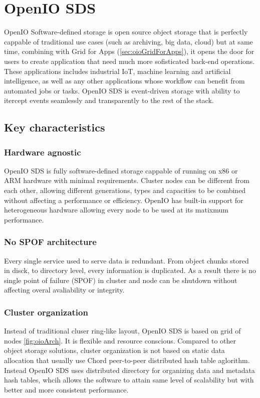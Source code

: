 \chapter{OpenIO SDS}
    OpenIO Software-defined storage is open source object storage that is perfectly cappable of traditional use cases (such as archiving, big data, cloud) but at same time, combining with Grid for Apps (\ref{sec:oioGridForApps}), it opens the door for users to create application that need much more sofisticated back-end operations. These applications includes industrial IoT, machine learning and artificial intelligence, as well as any other applications whose workflow can benefit from automated jobs or tasks\cite{oioNextGen}. OpenIO SDS is event-driven storage with ability to itercept events seamlessly and transparently to the rest of the stack.

    \section{Key characteristics}
    \subsection*{Hardware agnostic}
    OpenIO SDS is fully software-defined storage cappable of running on x86 or ARM hardware with minimal requirements. Cluster nodes can be different from each other, allowing different generations, types and capacities to be combined without affecting a performance or efficiency\cite{oioKeyChars}.
    OpenIO has built-in support for heterogeneous hardware allowing every node to be used at its matixmum performance.
    \subsection*{No SPOF architecture}
    Every single service used to serve data is redundant. From object chunks stored in disck, to directory level, every information is duplicated. As a result there is no single point of failure (SPOF) in cluster and node can be shutdown without affecting overal avaliability or integrity\cite{oioCoreSolution}.
    \subsection*{Cluster organization}
    Instead of traditional cluser ring-like layout, OpenIO SDS is based on grid of nodes \ref{fig:oioArch}. It is flexible and resource conscious. Compared to other object storage solutions, cluster organization is not based on static data allocation that usually use Chord peer-to-peer distributed hash table aglorithm. Instead OpenIO SDS uses distributed directory for organizing data and metadata hash tables, whcih allows the software to attain same level of scalability but with better and more consistent performance\cite{oioKeyChars}.

